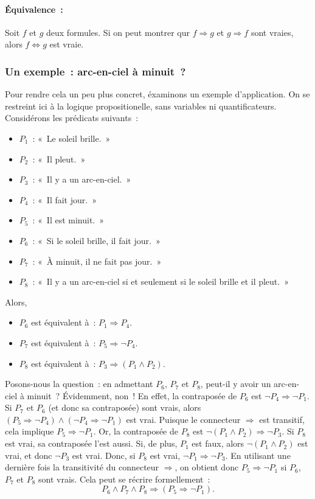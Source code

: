 \medskip

\paragraph{Équivalence :} 
    Soit $f$ et $g$ deux formules. 
    Si on peut montrer qur $f \Rightarrow g$ et $g \Rightarrow f$ sont vraies, alors $f \Leftrightarrow g$ est vraie.

\subsubsection{Un exemple : arc-en-ciel à minuit ?}

Pour rendre cela un peu plus concret, éxaminons un exemple d'application. 
On se restreint ici à la logique propositionelle, sans variables ni quantificateurs. 
Considérons les prédicats suivants : 
\begin{itemize}[nosep]
    \item $P_1$ : « Le soleil brille. »
    \item $P_2$ : « Il pleut. »
    \item $P_3$ : « Il y a un arc-en-ciel. »
    \item $P_4$ : « Il fait jour. »
    \item $P_5$ : « Il est minuit. »
    \item $P_6$ : « Si le soleil brille, il fait jour. »
    \item $P_7$ : « À minuit, il ne fait pas jour. »
    \item $P_8$ : « Il y a un arc-en-ciel si et seulement si le soleil brille et il pleut. »
\end{itemize}
Alors, 
\begin{itemize}[nosep]
    \item $P_6$ est équivalent à : $P_1 \Rightarrow P_4$.
    \item $P_7$ est équivalent à : $P_5 \Rightarrow \neg P_4$.
    \item $P_8$ est équivalent à : $P_3 \Rightarrow (P_1 \wedge P_2)$.
\end{itemize}

Posons-nous la question : en admettant $P_6$, $P_7$ et $P_8$, peut-il y avoir un arc-en-ciel à minuit ? 
Évidemment, non ! 
En effet, la contraposée de $P_6$ est $\neg  P_4 \Rightarrow \neg P_1$. 
Si $P_7$ et $P_6$ (et donc sa contraposée) sont vrais, alors $(P_5 \Rightarrow \neg P_4) \wedge (\neg  P_4 \Rightarrow \neg P_1)$ est vrai. 
Puisque le connecteur $\Rightarrow$ est transitif, cela implique $P_5 \Rightarrow \neg P_1$. 
Or, la contraposée de $P_8$ est $\neg (P_1 \wedge P_2) \Rightarrow \neg P_3$. 
Si $P_8$ est vrai, sa contraposée l'est aussi. 
Si, de plus, $P_1$ est faux, alors $\neg (P_1 \wedge P_2)$ est vrai, et donc $\neg P_3$ est vrai. 
Donc, si $P_8$ est vrai, $\neg P_1 \Rightarrow \neg P_3$. 
En utilisant une dernière fois la transitivité du connecteur $\Rightarrow$, on obtient donc $P_5 \Rightarrow \neg P_1$ si $P_6$, $P_7$ et $P_8$ sont vrais. 
Cela peut se récrire formellement : 
\begin{equation*}
    P_6 \wedge P_7 \wedge P_8 \Rightarrow (P_5 \Rightarrow \neg P_1). 
\end{equation*}

